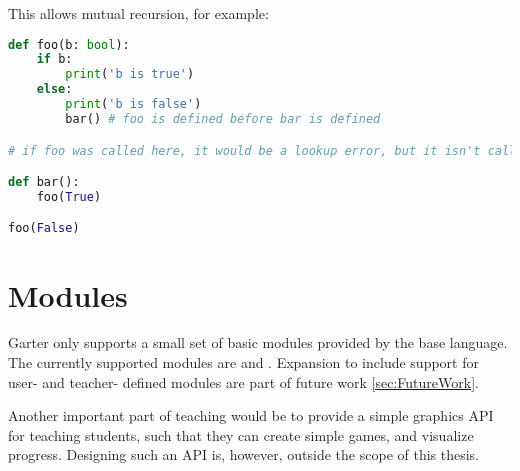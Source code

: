 This allows mutual recursion, for example:

\begin{lstlisting}[language=Python]
def foo(b: bool):
    if b:
        print('b is true')
    else:
        print('b is false')
        bar() # foo is defined before bar is defined

# if foo was called here, it would be a lookup error, but it isn't called until after so it's OK

def bar():
    foo(True)

foo(False)
\end{lstlisting}

\section{Modules}

Garter only supports a small set of basic modules provided by the base language.
The currently supported modules are  and . Expansion
to include support for user- and teacher- defined modules are part of future
work \ref{sec:FutureWork}.

Another important part of teaching would be to provide a simple graphics API
for teaching students, such that they can create simple games, and visualize
progress. Designing such an API is, however, outside the scope of this thesis.


